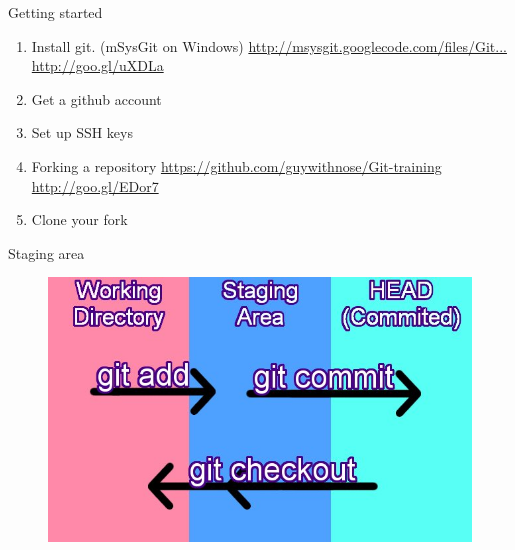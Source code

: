 \documentclass[14pt]{beamer}
\begin{document}
\begin{frame}{Getting started}
	\begin{enumerate}
		\small
		\item Install git. (mSysGit on Windows)\newline
		\href{http://msysgit.googlecode.com/files/Git-1.7.11-preview20120710.exe}{http://msysgit.googlecode.com/files/Git...}
		\href{http://goo.gl/uXDLa}{http://goo.gl/uXDLa}
		\item Get a github account
		\item Set up SSH keys
		\item Forking a repository\newline
		\href{https://github.com/guywithnose/Git-training}{https://github.com/guywithnose/Git-training}
		\href{http://goo.gl/EDor7}{http://goo.gl/EDor7}
		\item Clone your fork
	\end{enumerate}
\end{frame}

\begin{frame}{Staging area}
	\begin{figure}[htb]
		\centering
		\includegraphics[width=\textwidth]{commit-add-reset.jpg}
	\end{figure}
\end{frame}
\end{document}
